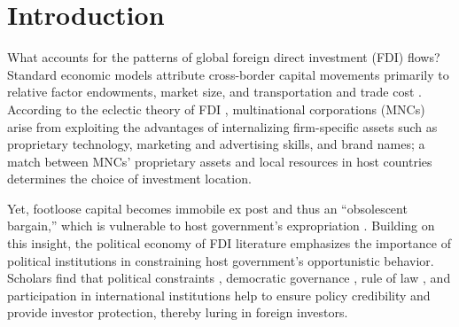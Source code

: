 \documentclass[reqno,onecolumn,letterpaper,12pt]{article}
\begin{document}


\clearpage
\doublespacing
\setcounter{page}{1}
\section{Introduction}


What accounts for the patterns of global foreign direct investment (FDI) flows? Standard economic models attribute cross-border capital movements primarily to relative factor endowments, market size, and transportation and trade cost \citep[see,~e.g.,][]{Helpman:1984,Carr_et_al:2001}.
According to the eclectic theory of FDI \citep{Dunning:1988,Dunning:1992}, multinational corporations (MNCs) arise from exploiting the advantages of internalizing firm-specific assets such as proprietary technology, marketing and advertising skills, and brand names; a match between MNCs' proprietary assets and local resources in host countries determines the choice of investment location.

Yet, footloose capital becomes immobile ex post and thus an ``obsolescent bargain,'' which is vulnerable to host government's expropriation \citep{Vernon:1971,Vernon:1980}. Building on this insight, the political economy of FDI literature emphasizes the importance of political institutions in constraining host government's opportunistic behavior. Scholars find that political constraints \citep{Henisz:2000}, democratic governance \citep{Jensen:2003,Jensen:2006}, rule of law \citep{Li_Resnick:2003,Staats_Biglaiser:2012}, and participation in international institutions \citep{Buthe_Milner:2008,Allee_Peinhardt:2011} help to ensure policy credibility and provide investor protection, thereby luring in foreign investors.
\end{document}
